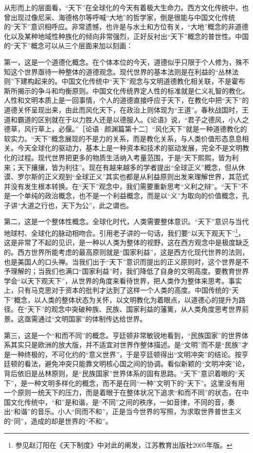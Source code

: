 \documentclass[UTF8, 12pt, a4paper]{ctexrep}
\begin{document}
从形而上的层面看，“天下”在全球化的今天有着极大生命力。西方文化传统中，也曾出现过像尼采、海德格尔等呼喊“大地”的哲学家，倒是很能与中国文化传统的“天下”意识相呼应。非常遗憾，也许是与水土和方位有关，“大地”概念的非道德化以及某种地域性种族化的倾向非常强烈，正好反衬出“天下”概念的普世性。中国的“天下”概念可以从三个层面来加以刻画：

第一，这是一个道德化概念。在个体本位的今天，道德似乎只限于个人修为，殊不知这个世界亟待一种整体的道德观念。现代世界的基本法则是在利益的“丛林法则”下建构起来的。中国文化传统中“天下”观念与文明道德教化相关联，不是霍布斯所揭示的争斗和均衡原则。中国文化传统界定人性的标准就是仁义礼智的教化。人性和文明本质上是一回事情，个人的道德直接呼应于天下，在教化中把“天下”的道德关怀呈现出来，由此而风化天下，在政治上则体现为“王道”。春秋战国时，王道和霸道的区别就在于以力胜人还是以德服人。《论语》说，“君子之德风，小人之德草，风行草上，必偃。”［论语·颜渊篇第十二］“风化天下”就是一种道德教化的软实力。“天下”概念展现的不是力的关系，而是教化关系，与人类价值形态息息相关。今天全球化的驱动力，基本上是一种资本和技术的驱动发展，完全不是文明教化的过程。现代世界把更多的物质生活纳入考量范围，于是“天下熙熙，皆为利来；天下攘攘，皆为利往”。现在有越来越多的学者提出“全球正义”概念，但从休谟、罗尔斯的正义观到“全球正义”其实也都是从利益原则出发来理解世界，其范式并没有发生根本转换。在“天下”观念中，我们需要重新思考“义利之辩”。“天下”不是一个单纯的政治概念，也不是一个利益概念，而是以“义”为取向的价值概念，孔子讲“大道之行也，天下为公”，此之谓也。

第二，这是一个整体性概念。全球化时代，人类需要整体意识。“天下”意识与当代地球村、全球化的脉动相吻合。引用老子讲的一句话，我们要“以天下观天下”\footnote{参见赵汀阳在《天下制度》中对此的阐发，江苏教育出版社2005年版。}，这是非常了不起的见识，是一种以人类为整体的视野，这在西方观念中是极度缺乏的。西方世界所能考虑的最高原则就是“国家利益”，这是西方化现代世界的法则，也是美国人的口头禅。当我们出于“天下”意识而提出的正义原则时，这个世界是不予理解的；当我们也满口“国家利益”时，我们降低了自身的文明高度。要教育世界学会“以天下观天下”，从世界的角度来看待世界，把人类作为整体来思考。事实上，只有马克思对于资本的批判才达到了这样一个人类的高度。中国传统的“天下”概念，以人类的整体状态为关怀，以文明教化为着眼点，以道德心的提升为路径。在“天下”的观念中突破种族、民族、国家利益的藩篱，从人类角度思考世界前景。这亟需通过“文明国家”的体制传达给世界。

第三，这是一个“和而不同”的概念。亨廷顿非常敏锐地看到，“民族国家”的世界体系其实只是欧洲的放大版，并不适宜对世界作整体描述。是“文明”而不是“民族”才是一种终极的，不可化约的“意义世界”，于是亨廷顿得出“文明冲突”的结论。按亨廷顿的看法，避免冲突只能靠文明核心国之间的协调。看似新颖的“文明冲突”论，背后依旧是丛林原则，是“民族国家”世界体系的固有思路。“天下”意识着眼的“天下”，是一种文明多样化的概念，而不是在同“一种”文明下的“天下”。这里没有用一个原则一统天下的压力，而是着眼于在整体状况下追求“和而不同”的状态，在中国文化传统中，“和”是和谐，是“不同”之间的秩序，一如音律，不同的音，奏出“和谐”的音乐。小人“同而不和”，正是当今世界的写照，为求取世界普世主义的“同”，造成的却是世界的“不和”。
\end{document}
